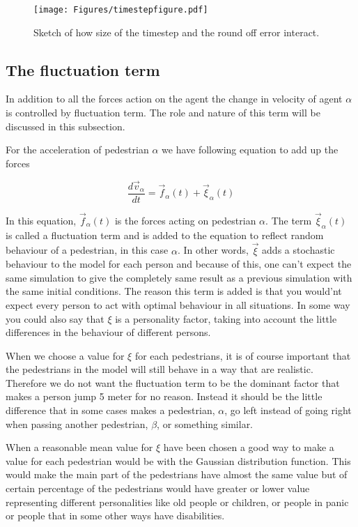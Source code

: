 \begin{figure}
    \centering
    {\texttt{[image: Figures/timestepfigure.pdf]}} 
    \caption{Sketch of how size of the timestep and the round off error interact.}
    \label{timestepfigure}
\end{figure}

\subsection{The fluctuation term}
In addition to all the forces action on the agent the change in velocity of agent 
$\alpha$ is controlled by fluctuation term. The role and nature of this term will 
be discussed in this subsection.

For the acceleration of pedestrian $\alpha$ we have following equation to add up the forces

\begin{equation}
\frac{d\vec{v}_{\alpha}}{dt}=\vec{f}_{\alpha}(t)+\vec{\xi}_{\alpha}(t)
\end{equation}

In this equation, $\vec{f}_{\alpha}(t)$ is the forces acting on pedestrian $\alpha$. 
The term $\vec{\xi}_{\alpha}(t)$ is called a fluctuation term and is added to the equation 
to reflect random behaviour of a pedestrian, in this case $\alpha$. In other words, $\vec{\xi}$ 
adds a stochastic behaviour to the model for each person and because of this, one can't expect 
the same simulation to give the completely same result as a previous simulation with the same 
initial conditions. The reason this term is added is that you would'nt expect every person to 
act with optimal behaviour in all situations. In some way you could also say that $\xi$ is a 
personality factor, taking into account the little differences in the behaviour of different 
persons.

When we choose a value for $\xi$ for each pedestrians, it is of course important that the 
pedestrians in the model will still behave in a way that are realistic. Therefore we do not 
want the fluctuation term to be the dominant factor that makes a person jump 5 meter for no reason. 
Instead it should be the little difference that in some cases makes a pedestrian, $\alpha$, go left 
instead of going right when passing another pedestrian, $\beta$, or something similar.  

When a reasonable mean value for $\xi$ have been chosen a good way to make a value for each 
pedestrian would be with the Gaussian distribution function. This would make the main part of 
the pedestrians have almost the same value but of certain percentage of the pedestrians would 
have greater or lower value representing different personalities like old people or children, 
or people in panic or people that in some other ways have disabilities. 
